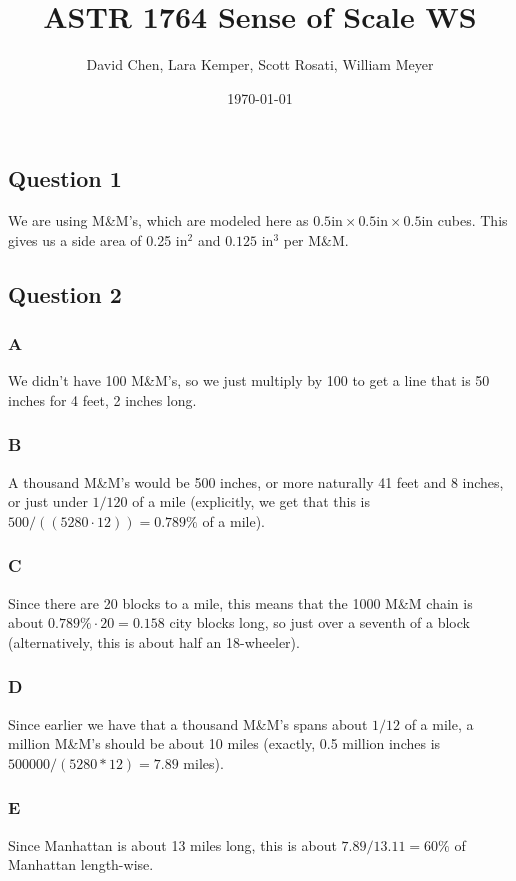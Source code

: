 \documentclass[12pt,letterpaper]{article}
\title{ASTR 1764 Sense of Scale WS}
\author{David Chen, Lara Kemper, Scott Rosati, William Meyer}
\date{\today}
\theoremstyle{definition}
\begin{document}
\maketitle

\subsection*{Question 1}

We are using M\&M's, which are modeled here as $0.5 \text{in}\times 0.5 \text{in}\times 0.5 \text{in}$ cubes. This gives us a side area of 0.25 in$^{2}$ and $0.125$ in$^{3}$ per M\&M.

\subsection*{Question 2}

\subsubsection*{A}
We didn't have 100 M\&M's, so we just multiply by 100 to get a line that is 50 inches for 4 feet, 2 inches long.
\subsubsection*{B}
A thousand M\&M's would be 500 inches, or more naturally 41 feet and 8 inches, or just under $1/120$ of a mile (explicitly, we get that this is $500 / ((5280 \cdot 12)) = 0.789\%$ of a mile).
\subsubsection*{C}
Since there are 20 blocks to a mile, this means that the 1000 M\&M chain is about $0.789\% \cdot 20 = 0.158$ city blocks long, so just over a seventh of a block (alternatively, this is about half an 18-wheeler).
\subsubsection*{D}
Since earlier we have that a thousand M\&M's spans about $1/12$ of a mile, a million M\&M's should be about 10 miles (exactly, 0.5 million inches is $500000 / (5280 * 12) = 7.89$ miles).
\subsubsection*{E}
Since Manhattan is about 13 miles long, this is about $7.89/13.11 = 60\%$ of Manhattan length-wise.
\end{document}
